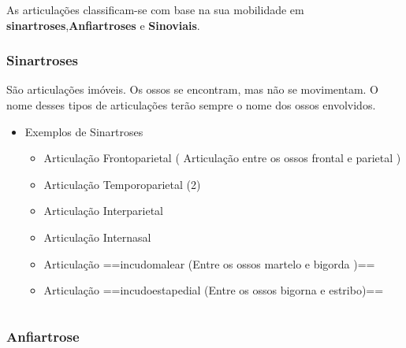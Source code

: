 \documentclass[
]{book}
\providecommand{\tightlist}{%
  \setlength{\itemsep}{0pt}\setlength{\parskip}{0pt}}
\begin{document}
As articulações classificam-se com base na sua mobilidade em \textbf{sinartroses},\textbf{Anfiartroses} e \textbf{Sinoviais}.

\hypertarget{sinartroses}{%
\subsubsection{Sinartroses}\label{sinartroses}}

São articulações imóveis. Os ossos se encontram, mas não se movimentam. O nome desses tipos de articulações terão sempre o nome dos ossos envolvidos.

\begin{itemize}
\tightlist
\item
  Exemplos de Sinartroses

  \begin{itemize}
  \tightlist
  \item
    Articulação Frontoparietal ( Articulação entre os ossos frontal e parietal )
  \item
    Articulação Temporoparietal (2)
  \item
    Articulação Interparietal
  \item
    Articulação Internasal
  \item
    Articulação ==incudomalear (Entre os ossos martelo e bigorda )==
  \item
    Articulação ==incudoestapedial (Entre os ossos bigorna e estribo)==
  \end{itemize}
\end{itemize}

\begin{longtable}[]{@{}
  >{\centering\arraybackslash}p{}
  >{\centering\arraybackslash}p{}@{}}
\toprule()
\endhead
\bottomrule()
\end{longtable}

\hypertarget{anfiartrose}{%
\subsubsection{Anfiartrose}\label{anfiartrose}}
\end{document}
